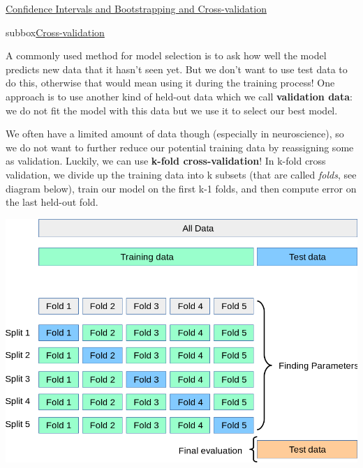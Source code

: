 \begin{textbox}{\href{https://compneuro.neuromatch.io/tutorials/W1D2_ModelFitting/student/W1D2_Tutorial2.html}{Confidence Intervals and Bootstrapping and Cross-validation}}
\begin{subbox}{subbox}{\href{https://compneuro.neuromatch.io/tutorials/W1D2_ModelFitting/student/W1D2_Tutorial6.html}{Cross-validation }  }
\scriptsize

A commonly used method for model selection is to ask how well the model predicts new data that it hasn't seen yet. But we don't want to use test data to do this, otherwise that would mean using it during the training process! One approach is to use another kind of held-out data which we call \textbf{validation data}: we do not fit the model with this data but we use it to select our best model.

We often have a limited amount of data though (especially in neuroscience), so we do not want to further reduce our potential training data by reassigning some as validation. Luckily, we can use \textbf{k-fold cross-validation}! In k-fold cross validation, we divide up the training data into k subsets (that are called \textit{folds}, see diagram below), train our model on the first k-1 folds, and then compute error on the last held-out fold.

\centering
\includegraphics[scale=0.14]{Figures/ModelFitting/MFFigure7.png}

\end{subbox}
\end{textbox}

